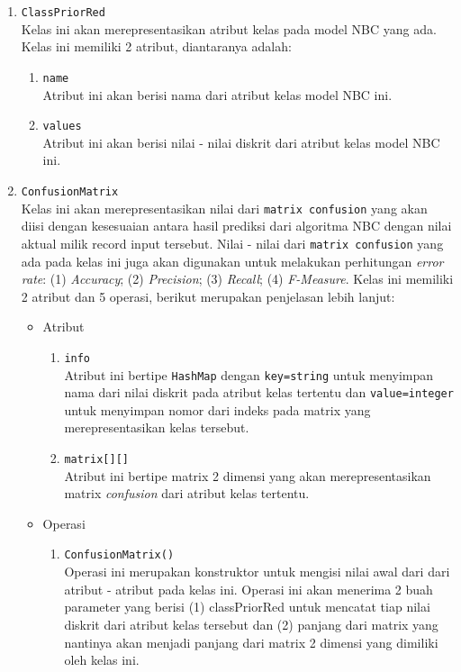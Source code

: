 \begin{enumerate}
\begin{enumerate}
		\item \texttt{ClassPriorRed}\\
		Kelas ini akan merepresentasikan atribut kelas pada model NBC yang ada. Kelas ini memiliki 2 atribut, diantaranya adalah:
		\begin{enumerate}
			\item \texttt{name}\\
			Atribut ini akan berisi nama dari atribut kelas model NBC ini.
			
			\item \texttt{values}\\
			Atribut ini akan berisi nilai - nilai diskrit dari atribut kelas model NBC ini.
		\end{enumerate}
		
		\item \texttt{ConfusionMatrix}\\		
		Kelas ini akan merepresentasikan nilai dari \texttt{matrix confusion} yang akan diisi dengan kesesuaian antara hasil prediksi dari algoritma NBC dengan nilai aktual milik record input tersebut. Nilai - nilai dari \texttt{matrix confusion} yang ada pada kelas ini juga akan digunakan untuk melakukan perhitungan \textit{error rate}: (1) \textit{Accuracy}; (2) \textit{Precision}; (3) \textit{Recall}; (4) \textit{F-Measure}. Kelas ini memiliki 2 atribut dan 5 operasi, berikut merupakan penjelasan lebih lanjut:
		\begin{itemize}
			\item Atribut
			\begin{enumerate}
				\item \texttt{info}\\
				Atribut ini bertipe \texttt{HashMap} dengan \texttt{key=string} untuk menyimpan nama dari nilai diskrit pada atribut kelas tertentu dan \texttt{value=integer} untuk menyimpan nomor dari indeks pada matrix yang merepresentasikan kelas tersebut.
			
				\item \texttt{matrix[][]}\\
				Atribut ini bertipe matrix 2 dimensi yang akan merepresentasikan matrix \textit{confusion} dari atribut kelas tertentu.
			
			\end{enumerate}
			
			\item Operasi
			\begin{enumerate}
				\item \texttt{ConfusionMatrix()}\\
				Operasi ini merupakan konstruktor untuk mengisi nilai awal dari dari atribut - atribut pada kelas ini. Operasi ini akan menerima 2 buah parameter yang berisi (1) classPriorRed untuk mencatat tiap nilai diskrit dari atribut kelas tersebut dan (2) panjang dari matrix yang nantinya akan menjadi panjang dari matrix 2 dimensi yang dimiliki oleh kelas ini.
				

\end{enumerate}
\end{itemize}
\end{enumerate}
\end{enumerate}
